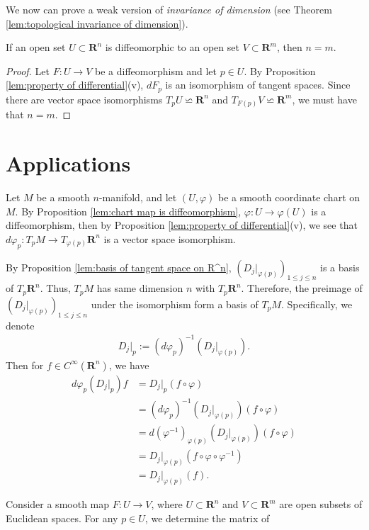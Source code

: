 We now can prove a weak version of \emph{invariance of dimension} (see Theorem \ref{lem:topological invariance of dimension}).

\begin{corollary}
    If an open set $U \subset \mathbf{R}^n$ is diffeomorphic to an open set $V \subset \mathbf{R}^m$, then $n = m$.
\end{corollary}

\begin{proof}
    Let $F : U \to V$ be a diffeomorphism and let $p \in U$. By Proposition \ref{lem:property of differential}(v), $dF_p$ is an isomorphism of tangent spaces. Since there are vector space isomorphisms $T_pU \backsimeq \mathbf{R}^n$ and $T_{F(p)}V \backsimeq \mathbf{R}^m$, we must have that $n = m$.
\end{proof}

\section{Applications}

Let $M$ be a smooth $n$-manifold, and let $(U, \varphi)$ be a smooth coordinate chart on $M$. By Proposition \ref{lem:chart map is diffeomorphism}, $\varphi : U \to \varphi(U)$ is a diffeomorphism, then by Proposition \ref{lem:property of differential}(v), we see that $d\varphi_p : T_pM \to T_{\varphi(p)}\mathbf{R}^n$ is a vector space isomorphism.

By Proposition \ref{lem:basis of tangent space on R^n}, $(D_{j}|_{\varphi(p)})_{1 \leq j \leq n}$ is a basis of $T_p\mathbf{R}^n$. Thus, $T_pM$ has same dimension $n$ with $T_p\mathbf{R}^n$. Therefore, the preimage of $(D_{j}|_{\varphi(p)})_{1 \leq j \leq n}$ under the isomorphism form a basis of $T_pM$. Specifically, we denote
    \begin{align*}
        D_{j}|_p := (d\varphi_p)^{-1}(D_{j}|_{\varphi(p)}).
    \end{align*}
Then for $f \in C^\infty(\mathbf{R}^n)$, we have
    \begin{align*}
        d\varphi_{p}(D_{j}|_p)f
        &= D_{j}|_p(f \circ \varphi)\\
        &= (d\varphi_p)^{-1}(D_{j}|_{\varphi(p)})(f \circ \varphi)\\
        &= d(\varphi^{-1})_{\varphi(p)}(D_{j}|_{\varphi(p)})(f \circ \varphi)\\
        &= D_{j}|_{\varphi(p)}(f \circ \varphi \circ \varphi^{-1})\\
        &= D_{j}|_{\varphi(p)}(f).
    \end{align*}


Consider a smooth map $F : U \to V$, where $U \subset \mathbf{R}^n$ and $V \subset \mathbf{R}^m$ are open subsets of Euclidean spaces. For any $p \in U$, we determine the matrix of 
